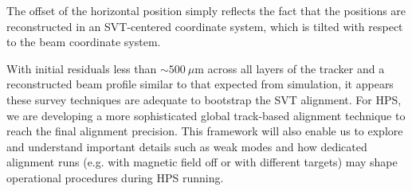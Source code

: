 The offset of the horizontal position simply reflects the fact that the positions are reconstructed in an SVT-centered coordinate system, which is tilted with respect to the beam coordinate system.

With initial residuals less than $\sim 500~\mu$m across all layers of 
the tracker and a reconstructed beam profile similar to that expected from simulation, it appears these survey techniques 
are adequate to bootstrap the SVT alignment. 
For HPS, we are developing a more sophisticated global track-based alignment technique to reach 
the final alignment precision. This framework will also enable us to explore and understand important details 
such as weak modes and how dedicated alignment runs 
(e.g. with magnetic field off or with different targets) may shape operational procedures during HPS running.
